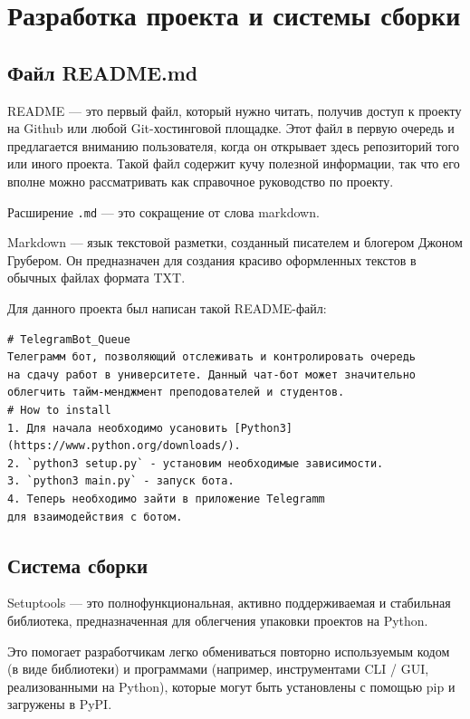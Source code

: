 \graphicspath{{./img/}} %

\chapter{Разработка проекта и системы сборки}
\section{Файл README.md}
README --- это первый файл, который нужно читать, получив доступ к проекту
на Github или любой Git-хостинговой площадке. Этот файл в первую очередь
и предлагается вниманию пользователя, когда он открывает здесь репозиторий
того или иного проекта. Такой файл содержит кучу полезной информации, так что
его вполне можно рассматривать как справочное руководство по проекту.\par
Расширение \texttt{.md} --- это сокращение от слова markdown.\par
Markdown — язык текстовой разметки, созданный писателем и блогером
Джоном Грубером. Он предназначен для создания красиво оформленных текстов
в обычных файлах формата TXT.\par
Для данного проекта был написан такой README-файл:

\begin{verbatim}
# TelegramBot_Queue
Телеграмм бот, позволяющий отслеживать и контролировать очередь
на сдачу работ в университете. Данный чат-бот может значительно
облегчить тайм-менджмент преподователей и студентов.
# How to install 
1. Для начала необходимо усановить [Python3]
(https://www.python.org/downloads/).
2. `python3 setup.py` - установим необходимые зависимости.
3. `python3 main.py` - запуск бота.
4. Теперь необходимо зайти в приложение Telegramm
для взаимодействия с ботом.
\end{verbatim}

\section{Система сборки}
Setuptools --- это полнофункциональная, активно поддерживаемая
и стабильная библиотека, предназначенная для облегчения упаковки
проектов на Python.

Это помогает разработчикам легко обмениваться повторно используемым кодом
(в виде библиотеки) и программами (например, инструментами CLI / GUI,
реализованными на Python), которые могут быть установлены с помощью pip
и загружены в PyPI.

